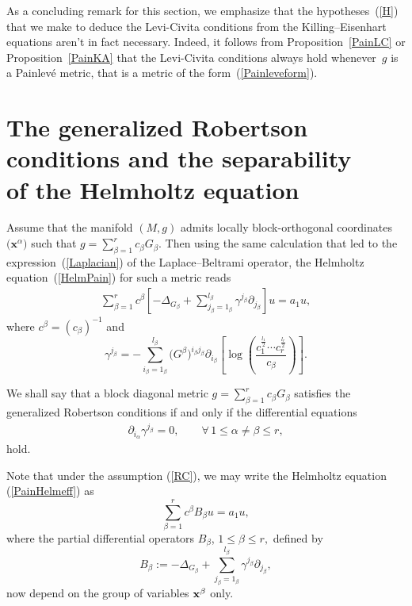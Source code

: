 \documentclass[pdftex]{sigma}
\numberwithin{equation}{section}
\newcommand{\ialpha}{i_{\alpha}}
\newcommand{\jbeta}{j_{\beta}}
\newcommand{\lbeta}{l_{\beta}}
\newcommand{\ibeta}{i_{\beta}}
\begin{document}
As a concluding remark for this section, we emphasize that the hypotheses~(\ref{H}) that we make to deduce the Levi-Civita conditions from the Killing--Eisenhart equations aren't in fact necessary. Indeed, it follows from Proposition~\ref{PainLC} or Proposition~\ref{PainKA} that the Levi-Civita conditions always hold whenever~$g$ is a Painlev\'e metric, that is a metric of the form~(\ref{Painleveform}).

\section[The generalized Robertson conditions and the separability of the Helmholtz equation]{The generalized Robertson conditions and the separability\\ of the Helmholtz equation}\label{PainHelmSection}

Assume that the manifold $(M,g)$ admits locally block-orthogonal coordinates $\big(\textbf{x}^\alpha\big)$ such that $g = \sum\limits_{\beta = 1}^r c_\beta G_\beta$. Then using the same calculation that led to the expression~(\ref{Laplacian}) of the Laplace--Beltrami operator, the Helmholtz equation~(\ref{HelmPain}) for such a metric reads
\begin{gather}\label{PainHelmeff}
\sum_{\beta =1}^{r}c^{\beta}\left[-\Delta_{G_{\beta}}+\sum_{\jbeta = 1_{\beta}}^{\lbeta}\gamma^{\jbeta}\partial_{\jbeta}\right]u=a_{1}u,
\end{gather}
where $c^\beta = (c_\beta)^{-1}$ and
\[
 \gamma^{\jbeta} = - \sum_{\ibeta = 1_\beta}^{l_\beta} \big(G^\beta \big)^{\ibeta \jbeta} \partial_{\ibeta} \left[ \log\left( \frac{c_{1}^{\frac{l_{1}}{2}}\cdots c_{r}^{\frac{l_{r}}{2}}}{c_{\beta}} \right)\right].
\]

We shall say that a block diagonal metric $g = \sum\limits_{\beta = 1}^r c_\beta G_\beta$ satisfies the generalized Robertson conditions if and only if the differential equations
\begin{gather} \label{RC}
 \partial_{\ialpha} \gamma^{\jbeta} = 0, \qquad \forall\, 1 \leq \alpha \ne \beta \leq r,
\end{gather}
hold.

Note that under the assumption (\ref{RC}), we may write the Helmholtz equation (\ref{PainHelmeff}) as
\[
\sum_{\beta = 1}^{r}c^{\beta} B_{\beta}u=a_{1}u,
\]
where the partial differential operators $B_{\beta}$, $1\leq \beta \leq r,$ defined by
\[
B_{\beta }:=-\Delta_{G_{\beta}}+\sum_{\jbeta = 1_{\beta}}^{\lbeta}\gamma^{\jbeta}\partial_{\jbeta},
\]
now depend on the group of variables ${\bf x}^{\beta}$ only.
\end{document}
